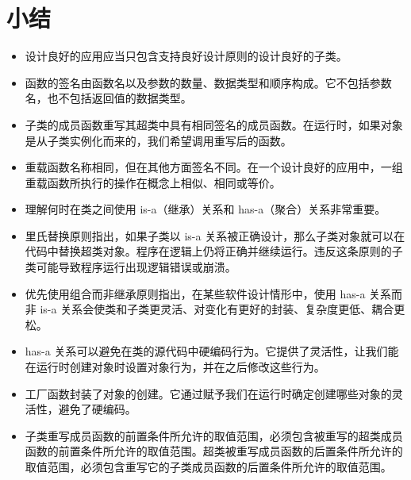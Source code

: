 

\section*{小结}

\begin{itemize}
\item 设计良好的应用应当只包含支持良好设计原则的设计良好的子类。
\item 函数的签名由函数名以及参数的数量、数据类型和顺序构成。它不包括参数名，也不包括返回值的数据类型。
\item 子类的成员函数重写其超类中具有相同签名的成员函数。在运行时，如果对象是从子类实例化而来的，我们希望调用重写后的函数。
\item 重载函数名称相同，但在其他方面签名不同。在一个设计良好的应用中，一组重载函数所执行的操作在概念上相似、相同或等价。
\item 理解何时在类之间使用 is-a（继承）关系和 has-a（聚合）关系非常重要。
\item 里氏替换原则指出，如果子类以 is-a 关系被正确设计，那么子类对象就可以在代码中替换超类对象。程序在逻辑上仍将正确并继续运行。违反这条原则的子类可能导致程序运行出现逻辑错误或崩溃。
\item 优先使用组合而非继承原则指出，在某些软件设计情形中，使用 has-a 关系而非 is-a 关系会使类和子类更灵活、对变化有更好的封装、复杂度更低、耦合更松。
\item has-a 关系可以避免在类的源代码中硬编码行为。它提供了灵活性，让我们能在运行时创建对象时设置对象行为，并在之后修改这些行为。
\item 工厂函数封装了对象的创建。它通过赋予我们在运行时确定创建哪些对象的灵活性，避免了硬编码。
\item 子类重写成员函数的前置条件所允许的取值范围，必须包含被重写的超类成员函数的前置条件所允许的取值范围。超类被重写成员函数的后置条件所允许的取值范围，必须包含重写它的子类成员函数的后置条件所允许的取值范围。
\end{itemize}
